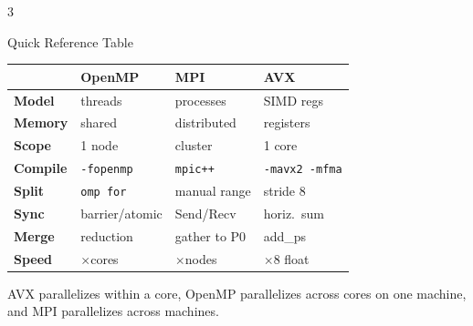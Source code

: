 \documentclass[8pt,a4paper,landscape]{article}
\begin{document}
\begin{multicols}{3}
\begin{highlightbox}{Quick Reference Table}
\renewcommand{\arraystretch}{1.2}
\scriptsize
\begin{tabular}{@{}l|l|l|l@{}}
 & \textbf{OpenMP} & \textbf{MPI} & \textbf{AVX} \\
\hline
\textbf{Model} & threads & processes & SIMD regs \\
\textbf{Memory} & shared & distributed & registers \\
\textbf{Scope} & 1 node & cluster & 1 core \\
\textbf{Compile} & \texttt{-fopenmp} & \texttt{mpic++} & \texttt{-mavx2 -mfma} \\
\textbf{Split} & \texttt{omp for} & manual range & stride 8 \\
\textbf{Sync} & barrier/atomic & Send/Recv & horiz.\ sum \\
\textbf{Merge} & reduction & gather to P0 & add\_ps \\
\textbf{Speed} & $\times$cores & $\times$nodes & $\times$8 float \\
\end{tabular}
\end{highlightbox}

AVX parallelizes within a core, OpenMP parallelizes across cores on one
machine, and MPI parallelizes across machines.

\end{multicols}
\end{document}

